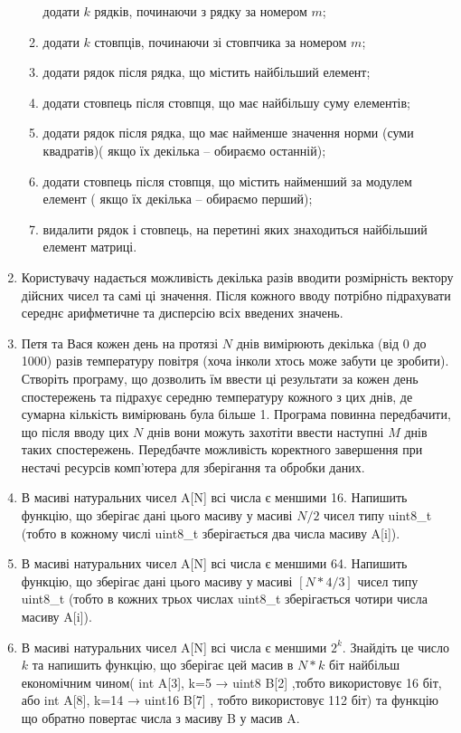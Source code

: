\documentclass[]{article}
\makeatletter
\newcommand{\xslalph}[1]{\expandafter\@xslalph\csname c@#1\endcsname}
\newcommand{\@xslalph}[1]{%
    \ifcase#1\or а\or б\or в\or г\or д\or e\or є\or ж\or з\or i%
    \or й\or к\or л\or м\or н\or о\or п\or р\or с\or т%
    \or у\or ф\or х\or ц\or ч\or ш\or ю\or я\or аа\or бб\or вв %
    \else\@ctrerr\fi%
}
\makeatother
\begin{document}
\begin{enumerate}
\begin{enumerate}[label=\xslalph*)]
  додати $k$ рядків, починаючи з рядку за номером $m$;
\item
  додати $k$ стовпців, починаючи зі стовпчика за номером $m$;
\item
  додати рядок після рядка, що містить найбільший елемент;
\item
  додати стовпець після стовпця, що має найбільшу суму елементів;
\item
  додати рядок після рядка, що має найменше значення норми (суми квадратів)(
якщо їх декілька -- обираємо останній);
\item
  додати стовпець після стовпця, що містить найменший за модулем елемент (
якщо їх декілька -- обираємо перший);
\item
  видалити рядок і стовпець, на перетині яких знаходиться найбільший
  елемент матриці.
\end{enumerate}

\item
  Користувачу надається можливість декілька разів вводити розмірність
  вектору дійсних чисел та самі ці значення. Після кожного вводу
  потрібно підрахувати середнє арифметичне та дисперсію всіх введених
  значень.
\item
  Петя та Вася кожен день на протязі $N$ днів вимірюють
  декілька (від 0 до 1000) разів температуру повітря (хоча інколи хтось
  може забути це зробити). Створіть програму, що дозволить їм ввести ці
  результати за кожен день спостережень та підрахує середню температуру
  кожного з цих днів, де сумарна кількість вимірювань була більше 1.
  Програма повинна передбачити, що після вводу цих $N$ днів вони можуть
  захотіти ввести наступні $M$ днів таких спостережень. Передбачте
  можливість коректного завершення при нестачі ресурсів комп'ютера для
  зберігання та обробки даних.
\item
 В масиві натуральних чисел A{[}N{]} всі числа є меншими 16. Напишить
  функцію, що зберігає дані цього масиву у масиві $N/2$ чисел типу
  uint8\_t (тобто в кожному числі uint8\_t зберігається два числа масиву
  A{[}i{]}).
\item
  В масиві натуральних чисел A{[}N{]} всі числа є меншими 64. Напишить
  функцію, що зберігає дані цього масиву у масиві $[N*4/3]$ чисел типу
  uint8\_t (тобто в кожних трьох числах uint8\_t зберігається чотири
  числа масиву A{[}i{]}).
\item
  В масиві натуральних чисел A{[}N{]} всі числа є меншими \(2^{k}\).
  Знайдіть це число $k$ та напишить функцію, що зберігає цей масив в $N*k$
  біт найбільш економічним чином( int A{[}3{]}, k=5 → uint8 B{[}2{]}
  ,тобто використовує 16 біт, або int A{[}8{]}, k=14 → uint16 B{[}7{]} ,
  тобто використовує 112 біт) та функцію що обратно повертає числа з
  масиву B у масив A.
\end{enumerate}
\end{document}
